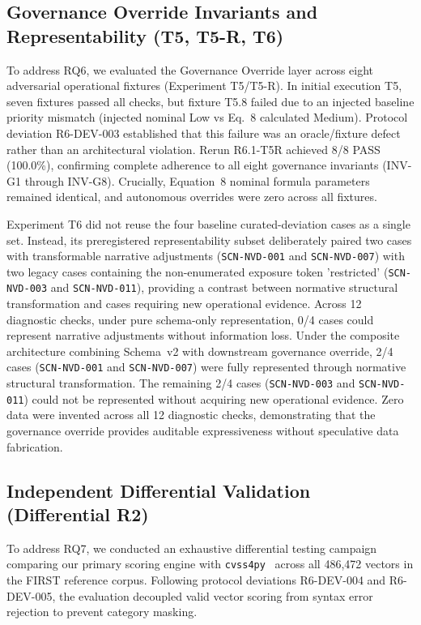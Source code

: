 \documentclass[conference]{IEEEtran}
\begin{document}
\subsection{Governance Override Invariants and Representability (T5, T5-R, T6)}
\label{sec:r6_t5_t6}
To address RQ6, we evaluated the Governance Override layer across eight adversarial operational fixtures (Experiment T5/T5-R). In initial execution T5, seven fixtures passed all checks, but fixture T5.8 failed due to an injected baseline priority mismatch (injected nominal Low vs Eq.~8 calculated Medium). Protocol deviation R6-DEV-003 established that this failure was an oracle/fixture defect rather than an architectural violation. Rerun R6.1-T5R achieved 8/8 PASS (100.0\%), confirming complete adherence to all eight governance invariants (INV-G1 through INV-G8). Crucially, Equation~8 nominal formula parameters remained identical, and autonomous overrides were zero across all fixtures.

Experiment T6 did not reuse the four baseline curated-deviation cases as a single set. Instead, its preregistered representability subset deliberately paired two cases with transformable narrative adjustments (\texttt{SCN-NVD-001} and \texttt{SCN-NVD-007}) with two legacy cases containing the non-enumerated exposure token 'restricted' (\texttt{SCN-NVD-003} and \texttt{SCN-NVD-011}), providing a contrast between normative structural transformation and cases requiring new operational evidence. Across 12 diagnostic checks, under pure schema-only representation, 0/4 cases could represent narrative adjustments without information loss. Under the composite architecture combining Schema~v2 with downstream governance override, 2/4 cases (\texttt{SCN-NVD-001} and \texttt{SCN-NVD-007}) were fully represented through normative structural transformation. The remaining 2/4 cases (\texttt{SCN-NVD-003} and \texttt{SCN-NVD-011}) could not be represented without acquiring new operational evidence. Zero data were invented across all 12 diagnostic checks, demonstrating that the governance override provides auditable expressiveness without speculative data fabrication.

\subsection{Independent Differential Validation (Differential R2)}
\label{sec:r6_diff}
To address RQ7, we conducted an exhaustive differential testing campaign comparing our primary scoring engine with \texttt{cvss4py}~\cite{cvss4py} across all 486,472 vectors in the FIRST reference corpus. Following protocol deviations R6-DEV-004 and R6-DEV-005, the evaluation decoupled valid vector scoring from syntax error rejection to prevent category masking.
\end{document}
